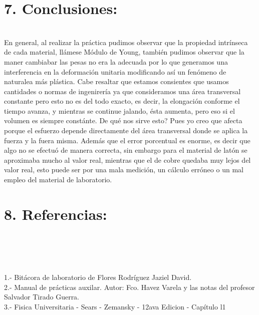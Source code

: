 \documentclass[10pt,a4paper]{article}
\begin{document}
\section*{7. Conclusiones:}\\
En general, al realizar la pr\'{a}ctica pudimos observar que la propiedad intr\'{i}nseca de cada material, ll\'{a}mese  M\'{o}dulo de Young, tambi\'{e}n pudimos observar que la maner cambiabar las pesas no era la adecuada por lo que generamos una interferencia en la deformaci\'{o}n unitaria modificando as\'{i} un fen\'{o}meno de naturalea m\'{a}s pl\'{a}stica. Cabe resaltar que estamos consientes que usamos cantidades o normas de ingenirer\'{i}a  ya que consideramos una \'{a}rea transversal constante pero esto no es del todo exacto, es decir, la elongaci\'{o}n conforme el tiempo avanza, y mientras se continue jalando, \'{e}sta aumenta, pero eso si el volumen es siempre const\'{a}nte. De qu\'{e} nos sirve esto? Pues yo creo que afecta porque el esfuerzo depende directamente del \'{a}rea transversal donde se aplica la fuerza y la fuera misma. Adem\'{a}s que el error porcentual es enorme, es decir que algo no se efectu\'{o} de manera correcta, sin embargo para el material de lat\'{o}n se aproximaba mucho al valor real, mientras que el de cobre quedaba muy lejos del valor real, esto puede ser por una mala medici\'{o}n, un c\'{a}lculo err\'{o}neo o un mal empleo del material de laboratorio.
 
\section*{8. Referencias:}\\
\\
\medskip
\\
\\1.- Bit\'{a}cora de laboratorio de Flores Rodr\'{i}guez Jaziel David.
\\
2.- Manual de pr\'{a}cticas auxilar. Autor: Fco. Havez Varela y las notas del profesor Salvador Tirado Guerra.
\\
3.- Fisica Universitaria - Sears - Zemansky - 12ava Edicion - Cap\'{i}tulo l1
\end{document}
